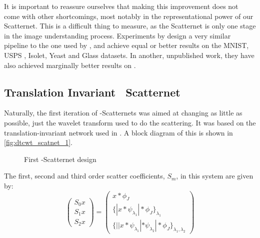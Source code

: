   It is important to reassure ourselves that making this improvement does not
  come with other shortcomings, most notably in the representational power of
  our Scatternet. This is a difficult thing to measure, as the Scatternet is
  only one stage in the image understanding process. Experiments
  by \citet{singh_multi-resolution_2016} design a very similar pipeline to the
  one used by \citet{oyallon_deep_2015}, and achieve equal or better results on
  the MNIST\citep{lecun_gradient-based_1998}, USPS \citep{hull_database_1994}, Isolet, 
  Yeast and Glass datasets\citep{lichman_uci_2013}. In another, unpublished
  work, they have also achieved marginally better results on \cifar.

\subsection{Translation Invariant \DTCWT\ Scatternet}
  Naturally, the first iteration of \DTCWT-Scatternets was aimed at changing as
  little as possible, just the wavelet transform used to do the scattering. It
  was based on the translation-invariant network used in
  \cite{bruna_invariant_2013}. A block diagram of this is
  shown in \autoref{fig:dtcwt_scatnet_1}. 

  \begin{figure}
    \vspace{1cm}
    \centering
      \makebox[\textwidth][c]{%
        \hspace{1cm}
        \resizebox{1.1\textwidth}{!}{}
      }
      \caption{First \DTCWT-Scatternet design}\label{fig:dtcwt_scatnet_1}
  \end{figure}

 The first, second and third order scatter coefficients, $S_m$, in this system are
  given by:
  \begin{equation}
    \left( \begin{array}{c}
      S_0x \\
      S_1x \\
      S_2x
    \end{array} \right) = 
    \left( \begin{array}{c}
      x \ast \phi_J \\
      \{ |x \ast \psi_{\lambda_1}| \ast \phi_J\}_{\lambda_1} \\
      \{ ||x \ast \psi_{\lambda_1} | \ast
        \psi_{\lambda_2} | \ast \phi_J \}_{\lambda_1,
        \lambda_2}
      \end{array} \right)
  \end{equation}

